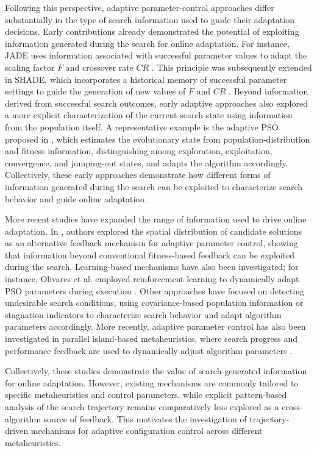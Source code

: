 \documentclass[journal,article,submit,moreauthors]{Definitions/mdpi}
\begin{document}
Following this perspective, adaptive parameter-control approaches differ
substantially in the type of search information used to guide their
adaptation decisions. Early contributions already demonstrated the potential
of exploiting information generated during the search for online adaptation.
For instance, JADE uses information associated with successful parameter
values to adapt the scaling factor $F$ and crossover rate $CR$
\cite{zhang2009jade}. This principle was subsequently extended in SHADE,
which incorporates a historical memory of successful parameter settings to
guide the generation of new values of $F$ and $CR$
\cite{tanabe2013success}. Beyond information derived from successful search
outcomes, early adaptive approaches also explored a more explicit
characterization of the current search state using information from the
population itself. A representative example is the adaptive PSO proposed in \cite{zhan2009adaptive}, which estimates the evolutionary state from population-distribution and fitness information, distinguishing among exploration, exploitation,
convergence, and jumping-out states, and adapts the algorithm accordingly. Collectively, these early approaches demonstrate how different forms of information generated during the search can be exploited to characterize search behavior and guide online adaptation.

More recent studies have expanded the range of information used to drive
online adaptation. In \cite{yang2022spatial}, authors explored the spatial distribution of candidate
solutions as an alternative feedback mechanism for adaptive parameter control,
showing that information beyond conventional fitness-based feedback can be
exploited during the search. Learning-based mechanisms
have also been investigated; for instance, Olivares et al. employed
reinforcement learning to dynamically adapt PSO parameters during execution
\cite{olivares2023learning}. Other approaches have focused on detecting
undesirable search conditions, using covariance-based population information
\cite{song2024differential} or stagnation indicators \cite{liu2024adaptive} to characterize search behavior and adapt algorithm parameters accordingly. More recently,
adaptive parameter control has also been investigated in parallel island-based
metaheuristics, where search progress and performance feedback are used to
dynamically adjust algorithm parameters \cite{prado2025parameter}.



Collectively, these studies demonstrate the value of search-generated
information for online adaptation. However, existing mechanisms are commonly
tailored to specific metaheuristics and control parameters, while explicit
pattern-based analysis of the search trajectory remains comparatively less
explored as a cross-algorithm source of feedback. This motivates the
investigation of trajectory-driven mechanisms for adaptive configuration
control across different metaheuristics.
\end{document}
